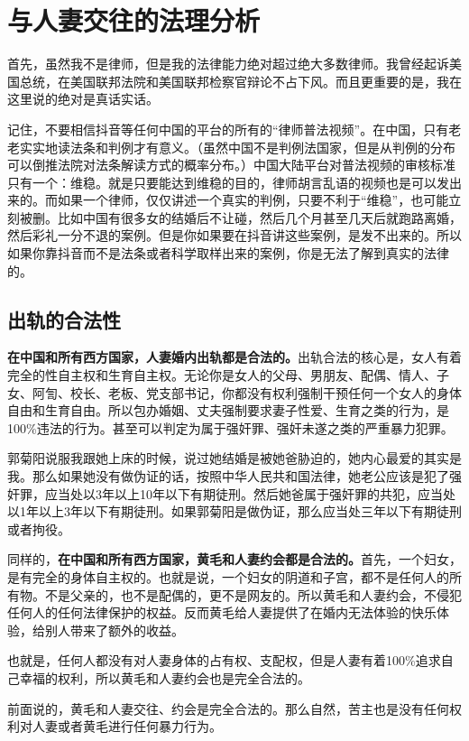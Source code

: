 \section{与人妻交往的法理分析}

首先，虽然我不是律师，但是我的法律能力绝对超过绝大多数律师。我曾经起诉美国总统，在美国联邦法院和美国联邦检察官辩论不占下风。而且更重要的是，我在这里说的绝对是真话实话。

记住，不要相信抖音等任何中国的平台的所有的``律师普法视频''。在中国，只有老老实实地读法条和判例才有意义。（虽然中国不是判例法国家，但是从判例的分布可以倒推法院对法条解读方式的概率分布。）中国大陆平台对普法视频的审核标准只有一个：维稳。就是只要能达到维稳的目的，律师胡言乱语的视频也是可以发出来的。而如果一个律师，仅仅讲述一个真实的判例，只要不利于``维稳''，也可能立刻被删。比如中国有很多女的结婚后不让碰，然后几个月甚至几天后就跑路离婚，然后彩礼一分不退的案例。但是你如果要在抖音讲这些案例，是发不出来的。所以如果你靠抖音而不是法条或者科学取样出来的案例，你是无法了解到真实的法律的。

\subsection{出轨的合法性}

\textbf{在中国和所有西方国家，人妻婚内出轨都是合法的。}出轨合法的核心是，女人有着完全的性自主权和生育自主权。无论你是女人的父母、男朋友、配偶、情人、子女、阿訇、校长、老板、党支部书记，你都没有权利强制干预任何一个女人的身体自由和生育自由。所以包办婚姻、丈夫强制要求妻子性爱、生育之类的行为，是100\%违法的行为。甚至可以判定为属于强奸罪、强奸未遂之类的严重暴力犯罪。

郭菊阳说服我跟她上床的时候，说过她结婚是被她爸胁迫的，她内心最爱的其实是我。那么如果她没有做伪证的话，按照中华人民共和国法律，她老公应该是犯了强奸罪，应当处以3年以上10年以下有期徒刑。然后她爸属于强奸罪的共犯，应当处以1年以上3年以下有期徒刑。如果郭菊阳是做伪证，那么应当处三年以下有期徒刑或者拘役。

同样的，\textbf{在中国和所有西方国家，黄毛和人妻约会都是合法的。}首先，一个妇女，是有完全的身体自主权的。也就是说，一个妇女的阴道和子宫，都不是任何人的所有物。不是父亲的，也不是配偶的，更不是网友的。所以黄毛和人妻约会，不侵犯任何人的任何法律保护的权益。反而黄毛给人妻提供了在婚内无法体验的快乐体验，给别人带来了额外的收益。

也就是，任何人都没有对人妻身体的占有权、支配权，但是人妻有着100\%追求自己幸福的权利，所以黄毛和人妻约会也是完全合法的。

前面说的，黄毛和人妻交往、约会是完全合法的。那么自然，苦主也是没有任何权利对人妻或者黄毛进行任何暴力行为。


